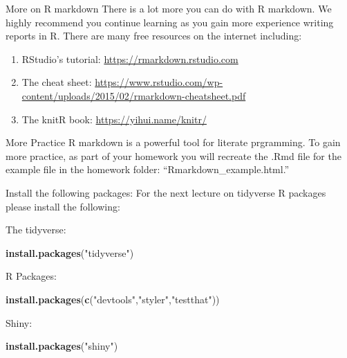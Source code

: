 \documentclass[
  ignorenonframetext,
  aspectratio=169]{beamer}
\newenvironment{Shaded}{\begin{snugshade}}{\end{snugshade}}
\newcommand{\FunctionTok}[1]{\textcolor[rgb]{0.13,0.29,0.53}{\textbf{#1}}}
\newcommand{\NormalTok}[1]{#1}
\newcommand{\StringTok}[1]{\textcolor[rgb]{0.31,0.60,0.02}{#1}}
\providecommand{\tightlist}{%
  \setlength{\itemsep}{0pt}\setlength{\parskip}{0pt}}
\begin{document}
\begin{frame}{More on R markdown}
\label{more-on-r-markdown}
There is a lot more you can do with R markdown. We highly recommend you
continue learning as you gain more experience writing reports in R.
There are many free resources on the internet including:

\begin{enumerate}
\tightlist
\item
  RStudio's tutorial: \url{https://rmarkdown.rstudio.com}
\item
  The cheat sheet:
  \url{https://www.rstudio.com/wp-content/uploads/2015/02/rmarkdown-cheatsheet.pdf}
\item
  The knitR book: \url{https://yihui.name/knitr/}
\end{enumerate}
\end{frame}

\begin{frame}{More Practice}
\label{more-practice}
R markdown is a powerful tool for literate prgramming. To gain more
practice, as part of your homework you will recreate the .Rmd file for
the example file in the homework folder: ``Rmarkdown\_example.html.''
\end{frame}

\begin{frame}[fragile]{Install the following packages:}
\label{install-the-following-packages}
For the next lecture on tidyverse R packages please install the
following:

The tidyverse:

\begin{Shaded}
\begin{Highlighting}[]
\FunctionTok{install.packages}\NormalTok{(}\StringTok{"tidyverse"}\NormalTok{)}
\end{Highlighting}
\end{Shaded}

R Packages:

\begin{Shaded}
\begin{Highlighting}[]
\FunctionTok{install.packages}\NormalTok{(}\FunctionTok{c}\NormalTok{(}\StringTok{"devtools"}\NormalTok{,}\StringTok{"styler"}\NormalTok{,}\StringTok{"testthat"}\NormalTok{))}
\end{Highlighting}
\end{Shaded}

Shiny:

\begin{Shaded}
\begin{Highlighting}[]
\FunctionTok{install.packages}\NormalTok{(}\StringTok{"shiny"}\NormalTok{)}
\end{Highlighting}
\end{Shaded}
\end{frame}
\end{document}
